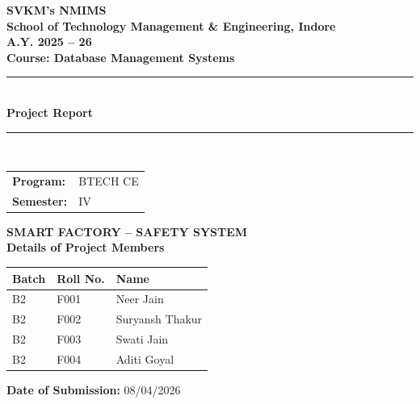 \documentclass[12pt, a4paper]{article}
\begin{document}
\begin{titlepage}
    \centering
    \vspace*{1cm}
    
    {\Large \textbf{SVKM's NMIMS}} \\[0.4cm]
    {\Large \textbf{School of Technology Management \& Engineering, Indore}} \\[0.4cm]
    {\large \textbf{A.Y. 2025 -- 26}} \\[0.8cm]
    {\large \textbf{Course: Database Management Systems}} \\[1cm]
    
    \rule{\linewidth}{0.5pt} \\[0.5cm]
    {\Huge \textbf{Project Report}} \\[0.3cm]
    \rule{\linewidth}{0.5pt} \\[1cm]

    \begin{tabular}{@{} l l @{}}
        \textbf{Program:} & BTECH CE \\[4pt]
        \textbf{Semester:} & IV \\
    \end{tabular}

    \vspace{1.2cm}
    {\LARGE \textbf{SMART FACTORY -- SAFETY SYSTEM}} \\[1.5cm]

    {\large \textbf{Details of Project Members}} \\[0.5cm]
    \begin{tabular}{|>{\centering\arraybackslash}p{2.5cm}|>{\centering\arraybackslash}p{2.5cm}|>{\centering\arraybackslash}p{6cm}|}
        \hline
        \textbf{Batch} & \textbf{Roll No.} & \textbf{Name} \\
        \hline
        B2 & F001 & Neer Jain \\
        \hline
        B2 & F002 & Suryansh Thakur \\
        \hline
        B2 & F003 & Swati Jain \\
        \hline
        B2 & F004 & Aditi Goyal \\
        \hline
    \end{tabular}

    \vspace{1.2cm}
    {\normalsize \textbf{Date of Submission:} 08/04/2026} \\[1.2cm]


\end{titlepage}
\end{document}
